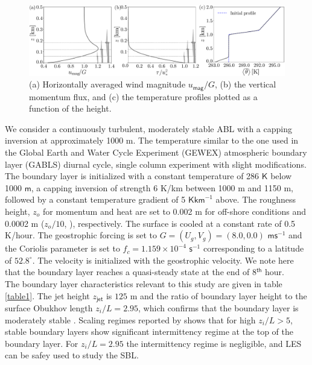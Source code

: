 \documentclass[%
 aip,
 amsmath,amssymb,
preprint,%
author-numerical,%
]{revtex4-1}
\begin{document}
\begin{figure}
 \centering
 \includegraphics[width=\linewidth]{fig3}
 \caption{(a) Horizontally averaged wind magnitude $u_\mathsf{mag}/G$, (b) the vertical momentum flux, and (c) the temperature profiles plotted as a function of the height.}
 \label{fig3}
\end{figure}
\vspace{-5mm}
We consider a continuously turbulent, moderately stable ABL with a capping inversion at approximately 1000 m. The temperature similar to the one used in the Global Earth and Water Cycle Experiment (GEWEX) atmospheric boundary layer (GABLS) diurnal cycle, single column experiment\cite{kum10} with slight modifications. The boundary layer is initialized with a constant temperature of 286 $\mathsf{K}$ below 1000 $\mathsf{m}$, a capping inversion of strength 6 K/km between 1000 m and 1150 m, followed by a constant temperature gradient of 5 $\mathsf{K}\mathsf{km}^{-1}$ above. The roughness height, $z_o$ for momentum and heat are set to 0.002 m \cite{dor15} for off-shore conditions and 0.0002 m ($z_o/10$, \cite{bru82}), respectively. The surface is cooled at a constant rate of 0.5 K/hour. The geostrophic forcing is set to $G=(U_g,V_g)=(8.0,0.0)$ $\mathsf{m}\mathsf{s}^{-1}$ and the Coriolis parameter is set to $f_c=1.159\times10^{-4}$ $\mathsf{s}^{-1}$ corresponding to a latitude of $52.8^\circ$. The velocity is initialized with the geostrophic velocity. We note here that the boundary layer reaches a quasi-steady state at the end of 8$^\mathsf{th}$ hour.\\
\indent The boundary layer characteristics relevant to this study are given in table \ref{table1}. The jet height $z_\mathsf{jet}$ is $125$ m and the ratio of boundary layer height to the surface Obukhov length $z_i/L=2.95$, which confirms that the boundary layer is moderately stable \cite{hol86}. Scaling regimes reported by \citeauthor{hol86} shows that for high $z_i/L > 5$, stable boundary layers show significant intermittency regime at the top of the boundary layer. For $z_i/L=2.95$ the intermittency regime is negligible, and LES can be safey used to study the SBL.\\
\end{document}

